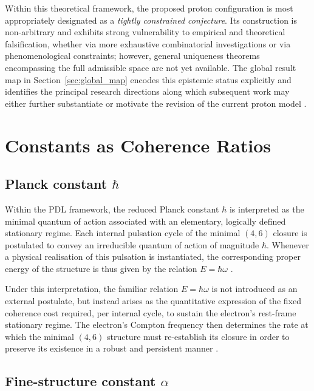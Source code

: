 \documentclass[11pt,a4paper]{article}
\begin{document}
Within this theoretical framework, the proposed proton configuration is most appropriately designated as a \emph{tightly constrained conjecture}. Its construction is non-arbitrary and exhibits strong vulnerability to empirical and theoretical falsification, whether via more exhaustive combinatorial investigations or via phenomenological constraints; however, general uniqueness theorems encompassing the full admissible space are not yet available. The global result map in Section~\ref{sec:global_map} encodes this epistemic status explicitly and identifies the principal research directions along which subsequent work may either further substantiate or motivate the revision of the current proton model \citep{PDL_position}.

\section{Constants as Coherence Ratios}
\label{sec:constants}

\subsection{Planck constant \texorpdfstring{\(\hbar\)}{hbar}}
\label{subsec:hbar}

Within the PDL framework, the reduced Planck constant \(\hbar\) is interpreted as the minimal quantum of action associated with an elementary, logically defined stationary regime. Each internal pulsation cycle of the minimal \((4,6)\) closure is postulated to convey an irreducible quantum of action of magnitude \(\hbar\). Whenever a physical realisation of this pulsation is instantiated, the corresponding proper energy of the structure is thus given by the relation \(E = \hbar \omega\)
\citep{PDL_Main_2026,PDL_intro}.

Under this interpretation, the familiar relation \(E = \hbar \omega\) is not introduced as an external postulate, but instead arises as the quantitative expression of the fixed coherence cost required, per internal cycle, to sustain the electron’s rest-frame stationary regime. The electron’s Compton frequency then determines the rate at which the minimal \((4,6)\) structure must re-establish its closure in order to preserve its existence in a robust and persistent manner
\citep{PDL_Main_2026,PDL_position}.

\subsection{Fine-structure constant \texorpdfstring{\(\alpha\)}{alpha}}
\label{subsec:alpha}
\end{document}
